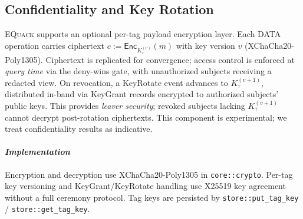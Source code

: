 \documentclass[10pt,journal,compsoc]{IEEEtran}
\newcommand{\equack}{\textsc{EQuack}}
\begin{document}
\subsection{Confidentiality and Key Rotation}

\equack{} supports an optional per-tag payload encryption layer. Each DATA operation carries ciphertext $c := \mathsf{Enc}_{K_{\tau}^{(v)}}(m)$ with key version $v$ (XChaCha20-Poly1305). Ciphertext is replicated for convergence; access control is enforced at \emph{query time} via the deny-wins gate, with unauthorized subjects receiving a redacted view. On revocation, a KeyRotate event advances to $K_{\tau}^{(v+1)}$, distributed in-band via KeyGrant records encrypted to authorized subjects' public keys. This provides \emph{leaver security}; revoked subjects lacking $K_{\tau}^{(v+1)}$ cannot decrypt post-rotation ciphertexts. This component is experimental; we treat confidentiality results as indicative.

\paragraph*{\textit{\textbf{Implementation}}} Encryption and decryption use XChaCha20-Poly1305 in \texttt{core::crypto}. Per-tag key versioning and KeyGrant/KeyRotate handling use X25519 key agreement without a full ceremony protocol. Tag keys are persisted by \texttt{store::put\_tag\_key} / \texttt{store::get\_tag\_key}.





\end{document}
